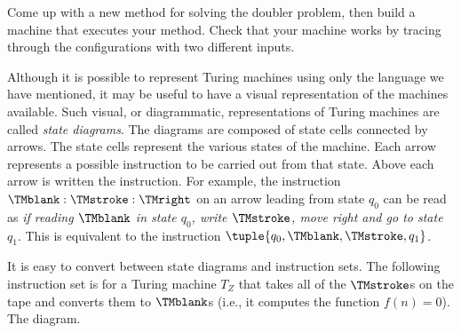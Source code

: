 \documentclass[../../include/open-logic-section]{subfiles}
\begin{document}
\begin{prob}
Come up with a new method for solving the doubler problem, then build
a machine that executes your method. Check that your machine works by
tracing through the configurations with two different inputs.
\end{prob}



\begin{explain}
Although it is possible to represent Turing machines using only the
language we have mentioned, it may be useful to have a visual
representation of the machines available. Such visual, or
diagrammatic, representations of Turing machines are called
\emph{state diagrams}. The diagrams are composed of state cells
connected by arrows. The state cells represent the various states of
the machine. Each arrow represents a possible instruction to be
carried out from that state. Above each arrow is written the
instruction. For example, the instruction $\TMblank :\TMstroke
:\TMright$ on an arrow leading from state $q_0$ can be read as
\emph{if reading $\TMblank$ in state $q_0$, write $\TMstroke$, move
  right and go to state $q_1$}. This is equivalent to the instruction
$\tuple{q_0, \TMblank, \TMstroke, q_1}$.

It is easy to convert between state diagrams and instruction sets. The
following instruction set is for a Turing machine $T_Z$ that takes all
of the $\TMstroke$s on the tape and converts them to $\TMblank$s
(i.e., it computes the function $f(n) = 0$). The diagram.
\end{explain}
\end{document}
